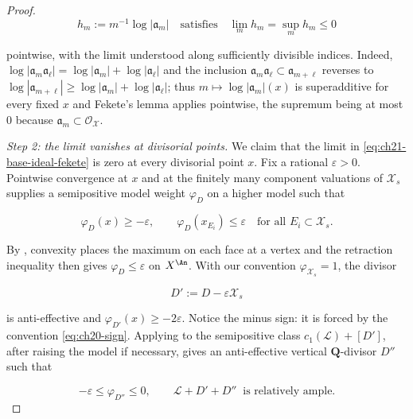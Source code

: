 \begin{proof}
\begin{equation}
\label{eq:ch21-base-ideal-fekete}
 h_m:=m^{-1}\log|\mathfrak a_m|
 \quad\text{satisfies}\quad
 \lim_m h_m=\sup_m h_m\leq0
\end{equation}

pointwise, with the limit understood along sufficiently divisible indices.
Indeed, \(\log|\mathfrak a_m\mathfrak a_\ell|=
\log|\mathfrak a_m|+\log|\mathfrak a_\ell|\) and the inclusion
\(\mathfrak a_m\mathfrak a_\ell\subset\mathfrak a_{m+\ell}\) reverses to
\(\log|\mathfrak a_{m+\ell}|\geq
\log|\mathfrak a_m|+\log|\mathfrak a_\ell|\); thus
\(m\mapsto\log|\mathfrak a_m|(x)\) is superadditive for every fixed \(x\)
and Fekete's lemma applies pointwise, the supremum being at most \(0\)
because \(\mathfrak a_m\subset\mathcal O_{\mathcal X}\).

\emph{Step 2: the limit vanishes at divisorial points.}
We claim that the limit in \eqref{eq:ch21-base-ideal-fekete} is zero at
every divisorial point \(x\).  Fix a
rational \(\varepsilon>0\).  Pointwise convergence at \(x\) and at the
finitely many component valuations of \(\mathcal X_s\) supplies a
semipositive model weight \(\varphi_D\) on a higher model such that

\begin{equation}
\label{eq:ch21-closedness-finite-values}
       \varphi_D(x)\geq-\varepsilon,
       \qquad
       \varphi_D(x_{E_i})\leq\varepsilon
       \quad\text{for all }E_i\subset\mathcal X_s.
\end{equation}

By , convexity places the maximum
on each face at a vertex and the retraction inequality then gives
\(\varphi_D\leq\varepsilon\) on \(X^{\An}\).  With our convention
\(\varphi_{\mathcal X_s}=1\), the divisor

\[
                         D':=D-\varepsilon\mathcal X_s
\]

is anti-effective and
\(\varphi_{D'}(x)\geq-2\varepsilon\).  Notice the minus sign: it is forced by
the convention \eqref{eq:ch20-sign}.  Applying
 to the semipositive class
\(c_1(\mathcal L)+[D']\), after raising the model if necessary, gives an
anti-effective vertical \(\mathbf Q\)-divisor \(D''\) such that

\begin{equation}
\label{eq:ch21-closedness-ample-perturbation}
        -\varepsilon\leq\varphi_{D''}\leq0,
        \qquad
        \mathcal L+D'+D''\
        \text{ is relatively ample}.
\end{equation}


\end{proof}
